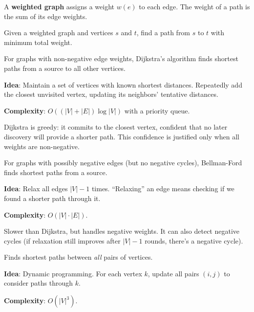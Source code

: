 \begin{definition}
A \textbf{weighted graph} assigns a weight $w(e)$ to each edge. The weight of a path is the sum of its edge weights.
\end{definition}

\begin{definition}
Given a weighted graph and vertices $s$ and $t$, find a path from $s$ to $t$ with minimum total weight.
\end{definition}

\begin{theorem}
For graphs with non-negative edge weights, Dijkstra's algorithm finds shortest paths from a source to all other vertices.

\textbf{Idea}: Maintain a set of vertices with known shortest distances. Repeatedly add the closest unvisited vertex, updating its neighbors' tentative distances.

\textbf{Complexity}: $O((|V| + |E|) \log |V|)$ with a priority queue.
\end{theorem}

Dijkstra is greedy: it commits to the closest vertex, confident that no later discovery will provide a shorter path. This confidence is justified only when all weights are non-negative.

\begin{theorem}
For graphs with possibly negative edges (but no negative cycles), Bellman-Ford finds shortest paths from a source.

\textbf{Idea}: Relax all edges $|V| - 1$ times. ``Relaxing'' an edge means checking if we found a shorter path through it.

\textbf{Complexity}: $O(|V| \cdot |E|)$.
\end{theorem}

Slower than Dijkstra, but handles negative weights. It can also detect negative cycles (if relaxation still improves after $|V| - 1$ rounds, there's a negative cycle).

\begin{theorem}
Finds shortest paths between \emph{all} pairs of vertices.

\textbf{Idea}: Dynamic programming. For each vertex $k$, update all pairs $(i, j)$ to consider paths through $k$.

\textbf{Complexity}: $O(|V|^3)$.
\end{theorem}

